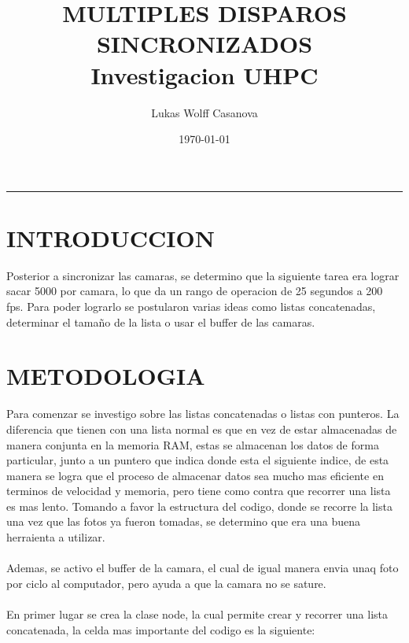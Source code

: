 \documentclass{article}
\title{\textbf{MULTIPLES DISPAROS SINCRONIZADOS}\\[0.5em] \large Investigacion UHPC}
\author{Lukas Wolff Casanova}
\date{\today}
\begin{document}
\maketitle
\hrule

\section{INTRODUCCION}

\noindent Posterior a sincronizar las camaras, se determino que la siguiente tarea era lograr sacar 5000 por camara, lo que da un rango de operacion de 25 segundos a 
200 fps. Para poder lograrlo se postularon varias ideas como listas concatenadas, determinar el tamaño de la lista o usar el buffer de las camaras.

\section{METODOLOGIA}

\noindent Para comenzar se investigo sobre las listas concatenadas o listas con punteros. La diferencia que tienen con una lista normal es que en vez de estar
almacenadas de manera conjunta en la memoria RAM, estas se almacenan los datos de forma particular, junto a un puntero que indica donde esta el siguiente
indice, de esta manera se logra que el proceso de almacenar datos sea mucho mas eficiente en terminos de velocidad y memoria, pero tiene como contra que recorrer 
una lista es mas lento. Tomando a favor la estructura del codigo, donde se recorre la lista una vez que las fotos ya fueron tomadas, se determino que era una
buena herraienta a utilizar.
\\ \\
Ademas, se activo el buffer de la camara, el cual de igual manera envia unaq foto por ciclo al computador, pero ayuda a que la camara no se sature.
\\ \\
En primer lugar se crea la clase node, la cual permite crear y recorrer una lista concatenada, la celda mas importante del 
codigo es la siguiente:
\end{document}
